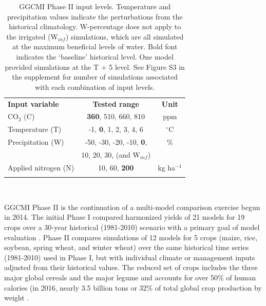\documentclass[esd, manuscript]{copernicus} %
\begin{document}
\begin{table}[t]
\caption{GGCMI Phase II input levels. Temperature and precipitation values indicate the perturbations from the historical climatology. W-percentage does not apply to the irrigated (W$_{inf}$) simulations, which are all simulated at the maximum beneficial levels of water. Bold font indicates the `baseline' historical level. One model provided simulations at the T + 5 level. See Figure S3 in the supplement for number of simulations associated with each combination of input levels.}
\label{table:inputs} 
    \begin{tabular}{lcc} 
        \tophline \vspace{1mm}
        \textbf{Input variable} & \textbf{Tested range} & \textbf{Unit} \\ \middlehline \vspace{1mm}
        CO$_2$ (C) & \textbf{360}, 510, 660, 810 & ppm\\ \middlehline \vspace{1mm}
        Temperature (T) & -1, \textbf{0}, 1, 2, 3, 4, 6 & $^{\circ}$C\\ \middlehline \vspace{1mm}
        Precipitation (W) & -50, -30, -20, -10, \textbf{0}, & \% \\
        {} & 10, 20, 30, (and W$_{inf}$) & {} \\ \middlehline \vspace{1mm}
        Applied nitrogen (N) & 10, 60, \textbf{200} & kg ha$^{-1}$ \\ \bottomhline
    \end{tabular}\\
\end{table}

GGCMI Phase II is the continuation of a multi-model comparison exercise begun in 2014. The initial Phase I compared harmonized yields of 21 models for 19 crops over a 30-year historical (1981-2010) scenario with a primary goal of model evaluation \citep{Elliott2015, muller_global_2017}. Phase II compares simulations of 12 models for 5 crops (maize, rice, soybean, spring wheat, and winter wheat) over the same historical time series (1981-2010) used in Phase I, but with individual climate or management inputs adjusted from their historical values. The reduced set of crops includes the three major global cereals and the major legume and accounts for over 50\% of human calories (in 2016, nearly 3.5 billion tons or 32\% of total global crop production by weight \citep{FAOSTAT}. 
\end{document}
